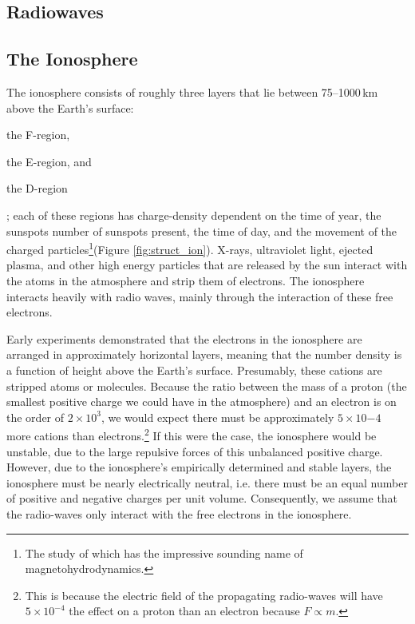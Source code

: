 \documentclass[11pt]{article}
\begin{document}
\subsection{Radiowaves} %
\label{sub:radiowaves}


\subsection{The Ionosphere} %
\label{sub:the_ionosphere}

The ionosphere consists of roughly three layers that lie between 75--1000\,km above the Earth's surface:
\begin{enumerate*}[(1)]
    \item the F-region,
    \item the E-region, and
    \item the D-region
\end{enumerate*}; each of these regions has charge-density dependent on the time of year, the sunspots number of sunspots present, the time of day, and the movement of the charged particles\footnote{The study of which has the impressive sounding name of magnetohydrodynamics.}(Figure \ref{fig:struct_ion}). X-rays, ultraviolet light, ejected plasma, and other high energy particles that are released by the sun interact with the atoms in the atmosphere and strip them of electrons.\cite{noauthor_tracking_nodate} The ionosphere interacts heavily with radio waves, mainly through the interaction of these free electrons.\cite{budden1961radio}

Early experiments demonstrated that the electrons in the ionosphere are arranged in approximately horizontal layers, meaning that the number density is a function of height above the Earth's surface. Presumably, these cations are stripped atoms or molecules. Because the ratio between the mass of a proton (the smallest positive charge we could have in the atmosphere) and an electron is on the order of $2\times10^3$, we would expect there must be approximately $5 \times10{-4}$ more cations than electrons.\footnote{This is because the electric field of the propagating radio-waves will have $5 \times10^{-4}$ the effect on a proton than an electron because $F \propto m$.} If this were the case, the ionosphere would be unstable, due to the large repulsive forces of this unbalanced positive charge. However, due to the ionosphere's empirically determined and stable layers, the ionosphere must be nearly electrically neutral, i.e. there must be an equal number of positive and negative charges per unit volume.\cite{budden1961radio} Consequently, we assume that the radio-waves only interact with the free electrons in the ionosphere.
\end{document}
